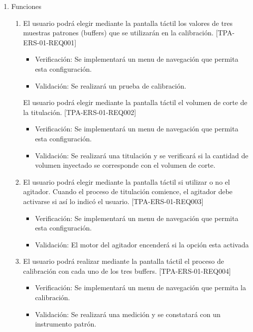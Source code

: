 \documentclass[11pt]{charter}
\begin{document}
\begin{enumerate}
\item Funciones
	\begin{enumerate}
	\item El usuario podrá elegir mediante la pantalla táctil los valores de tres muestras patrones (buffers) que se utilizarán en la calibración. [TPA-ERS-01-REQ001]
	\begin{itemize}
\item Verificación: Se implementará un menu de navegación que permita esta configuración.\\
\item Validación: Se realizará un prueba de calibración.\\
\end{itemize}
El usuario podrá elegir mediante la pantalla táctil el volumen de corte de la titulación. [TPA-ERS-01-REQ002]
\begin{itemize}
\item Verificación: Se implementará un menu de navegación que permita esta configuración.\\
\item Validación: Se realizará una titulación y se verificará si la cantidad de volumen inyectado se corresponde con el volumen de corte.\\
\end{itemize}
	\item El usuario podrá elegir mediante la pantalla táctil si utilizar o no el agitador. Cuando el proceso de titulación comience, el agitador debe activarse si así lo indicó el usuario. [TPA-ERS-01-REQ003]
	\begin{itemize}
\item Verificación: Se implementará un menu de navegación que permita esta configuración.\\
\item Validación: El motor del agitador encenderá si la opción esta activada\\
\end{itemize}
	\item El usuario podrá realizar mediante la pantalla táctil el proceso de calibración con cada uno de los tres buffers. [TPA-ERS-01-REQ004]
	\begin{itemize}
\item Verificación: Se implementará un menu de navegación que permita la calibración.\\
\item Validación: Se realizará una medición y se constatará con un instrumento patrón.\\

\end{itemize}
\end{enumerate}
\end{enumerate}
\end{document}
